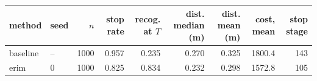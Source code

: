 \begin{tabular}{llrrrrrrr}
\toprule
method & seed & $n$ & stop rate & recog. at $T$ & dist. median (m) & dist. mean (m) & cost, mean & stop stage \\
\midrule
baseline & -- & 1000 & 0.957 & 0.235 & 0.270 & 0.325 & 1800.4 & 143 \\
erim & 0 & 1000 & 0.825 & 0.834 & 0.232 & 0.298 & 1572.8 & 105 \\
\bottomrule
\end{tabular}